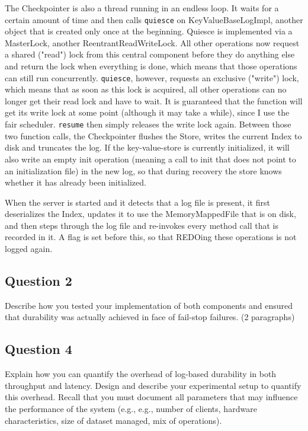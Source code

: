 \documentclass[12pt,a4paper]{article}
\begin{document}
The Checkpointer is also a thread running in an endless loop. It waits for a certain amount of time and then calls \texttt{quiesce} on KeyValueBaseLogImpl, another object that is created only once at the beginning. Quiesce is implemented via a MasterLock, another ReentrantReadWriteLock. All other operations now request a shared ("read") lock from this central component before they do anything else and return the lock when everything is done, which means that those operations can still run concurrently. \texttt{quiesce}, however, requests an exclusive ("write") lock, which means that as soon as this lock is acquired, all other operations can no longer get their read lock and have to wait. It is guaranteed that the function will get its write lock at some point (although it may take a while), since I use the fair scheduler. \texttt{resume} then simply releases the write lock again. Between those two function calls, the Checkpointer flushes the Store, writes the current Index to disk and truncates the log. If the key-value-store is currently initialized, it will also write an empty init operation (meaning a call to init that does not point to an initialization file) in the new log, so that during recovery the store knows whether it has already been initialized.

When the server is started and it detects that a log file is present, it first deserializes the Index, updates it to use the MemoryMappedFile that is on disk, and then steps through the log file and re-invokes every method call that is recorded in it. A flag is set before this, so that REDOing these operations is not logged again.


\subsection*{Question 2}
\label{sec:pq2}
Describe how you tested your implementation of both components and ensured that
durability was actually achieved in face of fail-stop failures. (2 paragraphs)


\subsection*{Question 4}
\label{sec:pq4}
Explain how you can quantify the overhead of log-based durability in both throughput and
latency. Design and describe your experimental setup to quantify this overhead. Recall that you must
document all parameters that may influence the performance of the system (e.g., e.g., number of clients,
hardware characteristics, size of dataset managed, mix of operations).
\end{document}
